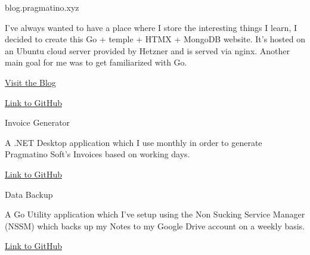 
\begin{cventries}

  \cventry
    {blog.pragmatino.xyz} %
    {} %
    {} %
    {} %
    { %
      \begin{cvitems} 
        \item {I've always wanted to have a place where I store the interesting things I learn, I decided to create this Go + temple + HTMX + MongoDB website. It's hosted on an Ubuntu cloud server provided by Hetzner and is served via nginx. Another main goal for me was to get familiarized with Go.}
        \item {\href{https://blog.pragmatino.xyz}{Visit the Blog}}
        \item {\href{https://github.com/art3xias23/go-blog}{Link to GitHub}}
      \end{cvitems}
    }

  \cventry
    {Invoice Generator} %
    {} %
    {} %
    {} %
    { %
      \begin{cvitems} 
        \item {A .NET Desktop application which I use monthly in order to generate Pragmatino Soft's Invoices based on working days.}
        \item {\href{https://github.com/art3xias23/csharp-Invoice_Generator}{Link to GitHub}}
      \end{cvitems}
    }

  \cventry
    {Data Backup} %
    {} %
    {} %
    {} %
    { %
      \begin{cvitems} 
        \item {A Go Utility application which I've setup using the Non Sucking Service Manager (NSSM) which backs up my Notes to my Google Drive account on a weekly basis.}
        \item {\href{https://github.com/art3xias23/go-data-backup}{Link to GitHub}}
      \end{cvitems}
    }


\end{cventries}
